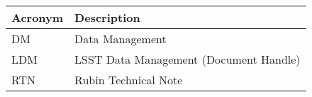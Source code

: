 \addtocounter{table}{-1}
\begin{longtable}{p{}p{}}\hline
\textbf{Acronym} & \textbf{Description}  \\\hline

DM & Data Management \\\hline
LDM & LSST Data Management (Document Handle) \\\hline
RTN & Rubin Technical Note \\\hline
\end{longtable}

